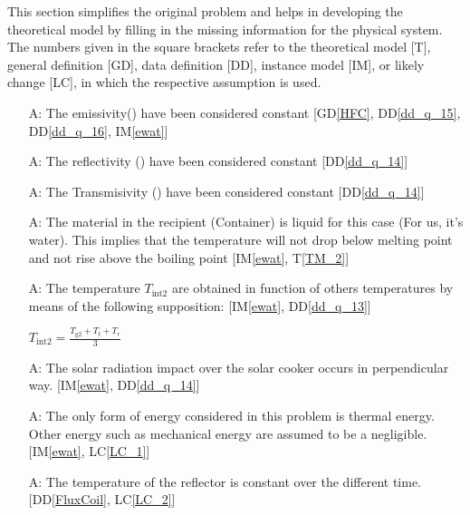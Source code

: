 \documentclass[12pt]{article}
\newcommand{\dref}[1]{GD\ref{#1}}
\newcommand{\ddref}[1]{DD\ref{#1}}
\newcommand{\tref}[1]{T\ref{#1}}
\newcounter{assumpnum} %
\newcommand{\iref}[1]{IM\ref{#1}}
\newcommand{\lcref}[1]{LC\ref{#1}}
\begin{document}
This section simplifies the original problem and helps in developing the
theoretical model by filling in the missing information for the physical
system. The numbers given in the square brackets refer to the theoretical model
[T], general definition [GD], data definition [DD], instance model [IM], or
likely change [LC], in which the respective assumption is used.

\begin{itemize}

\item[A\refstepcounter{assumpnum}\theassumpnum \label{A_common_constant_A_1}:] The emissivity(\si{\epsilon}) have been considered constant [\dref{HFC}, \ddref{dd_q_15}, \ddref{dd_q_16}, \iref{ewat}] 

\item[A\refstepcounter{assumpnum}\theassumpnum \label{A_common_constant_A_2}:] The reflectivity (\si{\rho}) have been considered constant [\ddref{dd_q_14}]

\item[A\refstepcounter{assumpnum}\theassumpnum \label{A_common_constant_A_3}:] The Transmisivity (\si{\tau}) have been considered constant [\ddref{dd_q_14}]

\item[A\refstepcounter{assumpnum}\theassumpnum \label{A_fluid_type}:] The material in the recipient (Container) is liquid for this case (For us, it's water). This implies that the  temperature will not drop below melting point and not rise above the boiling point [\iref{ewat}, \tref{TM_2}]   

\item[A\refstepcounter{assumpnum}\theassumpnum \label{A_int_temp_formula}:] The temperature $T_\text{int2}$ are obtained in function of others temperatures by means of the following supposition: [\iref{ewat}, \ddref{dd_q_13}] 
~\newline


\begin{center}  
$T_\text{int2} = \frac{T_\text{g2} + T_t + T_r}{3} $ 
\end{center}

\item[A\refstepcounter{assumpnum}\theassumpnum \label{A_radiation_impact}:] The solar radiation impact over the solar cooker occurs in perpendicular way. [\iref{ewat}, \ddref{dd_q_14}] 

\item[A\refstepcounter{assumpnum}\theassumpnum \label{A_radiation_impact_a_7}:] The only form of energy considered in this problem is thermal energy. Other energy such as mechanical energy are assumed to be a negligible. [\iref{ewat}, \lcref{LC_1}] 

\item[A\refstepcounter{assumpnum}\theassumpnum \label{A_radiation_impact_a_8}:] The temperature of the reflector is constant over the different time. [\ddref{FluxCoil}, \lcref{LC_2}] 


\end{itemize}
\end{document}
